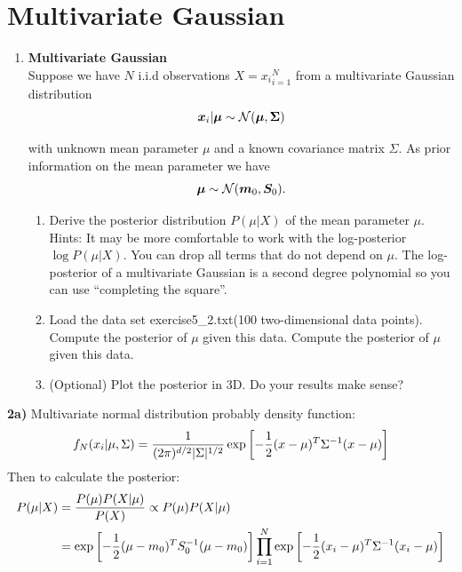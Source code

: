 \documentclass[12pt]{article}
\begin{document}
\section{Multivariate Gaussian}
    \begin{tcolorbox}
        \begin{enumerate}[start=2]
            \item \textbf{Multivariate Gaussian}\\
            Suppose we have $N$ i.i.d observations $X = {x_i}_{i=1}^N$ from a multivariate Gaussian distribution 
            $$ \bs x_i | \bs \mu \sim \mathcal{N}(\bs \mu, \bs \Sigma)$$

            with unknown mean parameter $\mu$ and a known covariance matrix $\Sigma$. As prior information on the mean parameter we have
            $$\bs \mu \sim \mathcal{N}(\bs m_0, \bs S_0).$$
            
            \begin{enumerate}
                \item Derive the posterior distribution $P(\mu|X)$ of the mean parameter $\mu$. Hints: It may be more comfortable to work with the log-posterior $\log P(\mu|X)$. You can drop all terms that do not depend on $\mu$. The log-posterior of a multivariate Gaussian is a second degree polynomial so you can use “completing the square”.
                \item Load the data set exercise5\_2.txt(100 two-dimensional data points). Compute the posterior of $\mu$ given this data. Compute the posterior of $\mu$ given this data.
                \item (Optional) Plot the posterior in 3D. Do your results make sense?
            \end{enumerate}
        \end{enumerate}
    \end{tcolorbox}

    \textbf{2a)} Multivariate normal distribution probably density function:
    \begin{align}
        f_N(x_i | \mu, \Sigma) = \mvn[x]{\mu}{\Sigma} 
    \end{align}
    Then to calculate the posterior:
    \begin{align}
        P(\mu | X) &= \frac{P(\mu) P(X|\mu)}{P(X)} \propto P(\mu) P(X | \mu) \\
        &= \mvnexpo[\mu]{m_0}{S_0} \prodlim[i]{1}{N} \mvnexpo[x_i]{\mu}{\Sigma} \\ 
    \end{align}
\end{document}
